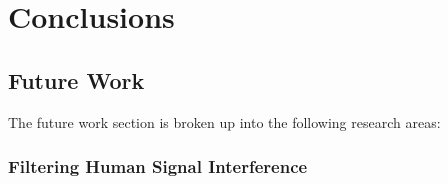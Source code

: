 \newpage
\chapter*{Conclusions}




%
%
\section*{Future Work}

The future work section is broken up into the following research areas:

\subsection*{Filtering Human Signal Interference}

